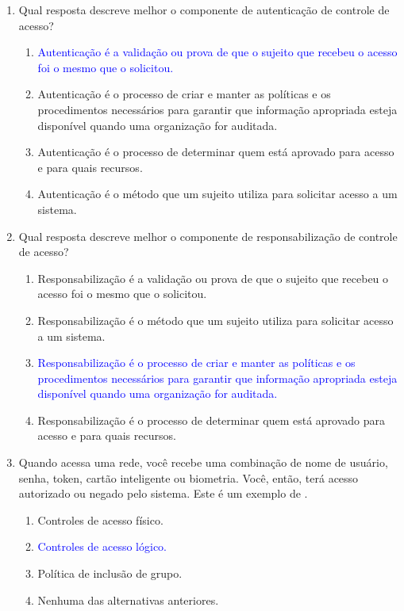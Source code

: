 \documentclass{report}
\begin{document}
\begin{enumerate}
		\item Qual resposta descreve melhor o componente de autenticação de controle de acesso?
		\begin{enumerate}[label=(\alph*)]
			\item \textcolor{blue}{Autenticação é a validação ou prova de que o sujeito que recebeu o acesso foi o mesmo que o solicitou.}
			\item Autenticação é o processo de criar e manter as políticas e os procedimentos necessários para garantir que informação apropriada esteja disponível quando uma organização for auditada.
			\item Autenticação é o processo de determinar quem está aprovado para acesso e para quais recursos.
			\item Autenticação é o método que um sujeito utiliza para solicitar acesso a um sistema.
		\end{enumerate}
		
		\item Qual resposta descreve melhor o componente de responsabilização de controle de acesso?
		\begin{enumerate}[label=(\alph*)]
			\item Responsabilização é a validação ou prova de que o sujeito que recebeu o acesso foi o mesmo que o solicitou.
			\item Responsabilização é o método que um sujeito utiliza para solicitar acesso a um sistema.
			\item \textcolor{blue}{Responsabilização é o processo de criar e manter as políticas e os procedimentos necessários para garantir que informação apropriada esteja disponível quando uma organização for auditada.}
			\item Responsabilização é o processo de determinar quem está aprovado para acesso e para quais recursos.
		\end{enumerate}
		
		\item Quando acessa uma rede, você recebe uma combinação de nome de usuário, senha, token, cartão inteligente ou biometria. Você, então, terá acesso autorizado ou negado pelo sistema. Este é um exemplo de .
		\begin{enumerate}[label=(\alph*)]
			\item Controles de acesso físico.
			\item \textcolor{blue}{Controles de acesso lógico.}
			\item Política de inclusão de grupo.
			\item Nenhuma das alternativas anteriores.
		\end{enumerate}
		

\end{enumerate}
\end{document}
